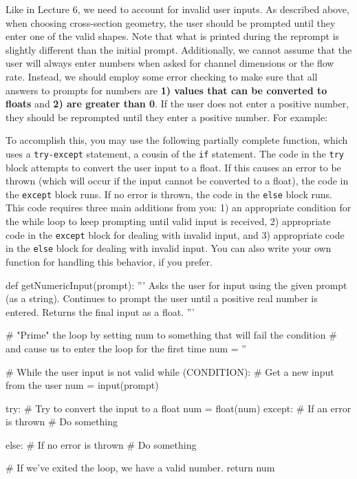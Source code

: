 \documentclass{homework}
\begin{document}


Like in Lecture 6, we need to account for invalid user inputs. As described above, when choosing cross-section geometry, the user should be prompted until they enter one of the valid shapes. Note that what is printed during the reprompt is slightly different than the initial prompt. Additionally, we cannot assume that the user will always enter numbers when asked for channel dimensions or the flow rate. Instead, we should employ some error checking to make sure that all answers to prompts for numbers are \textbf{1) values that can be converted to floats} and \textbf{2) are greater than 0}. If the user does not enter a positive number, they should be reprompted until they enter a positive number. For example:



To accomplish this, you may use the following partially complete function, which uses a \texttt{try-except} statement, a cousin of the \texttt{if} statement. The code in the \texttt{try} block attempts to convert the user input to a float. If this causes an error to be thrown (which will occur if the input cannot be converted to a float), the code in the \texttt{except} block runs. If no error is thrown, the code in the \texttt{else} block runs. This code requires three main additions from you: 1) an appropriate condition for the while loop to keep prompting until valid input is received, 2) appropriate code in the \texttt{except} block for dealing with invalid input, and 3) appropriate code in the \texttt{else} block for dealing with invalid input. You can also write your own function for handling this behavior, if you prefer.

\begin{python}
def getNumericInput(prompt):
    '''
    Asks the user for input using the given prompt (as a string). Continues to prompt
    the user until a positive real number is entered. Returns the final input as a float.
    '''
    
    # "Prime" the loop by setting num to something that will fail the condition
    # and cause us to enter the loop for the first time
    num = ''
    
    # While the user input is not valid
    while (CONDITION):
        # Get a new input from the user
        num = input(prompt)
        
        try: # Try to convert the input to a float
            num = float(num)
        except: # If an error is thrown
            # Do something
            
        else: # If no error is thrown
            # Do something
                
    # If we've exited the loop, we have a valid number.
    return num
\end{python}
\end{document}
